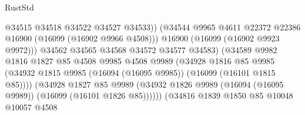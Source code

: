 \begin{lexlean}{RustStd}
\begin{coremodule}
                                            @34515
                                            @34518
                                            @34522
                                            @34527
                                            @34533))
                                        (@34544
                                          @9965
                                          @4611
                                          @22372
                                          @22386
                                          @16900
                                          (@16099 (@16902 @9966 @4508)))
                                        @16900
                                        (@16099 (@16902 @9923 @9972)))
                                      @34562
                                      @34565
                                      @34568
                                      @34572
                                      @34577
                                      @34583)
                                    (@34589
                                      @9982
                                      @1816
                                      @1827
                                      @85
                                      @4508
                                      @9985
                                      @4508
                                      @9989
                                      (@34928
                                        @1816
                                        @85
                                        @9985
                                        (@34932
                                          @1815
                                          @9985
                                          (@16094 (@16095 @9985))
                                          (@16099 (@16101 @1815 @85))))
                                      (@34928
                                        @1827
                                        @85
                                        @9989
                                        (@34932
                                          @1826
                                          @9989
                                          (@16094 (@16095 @9989))
                                          (@16099 (@16101 @1826 @85))))))
                                  (@34816
                                    @1839
                                    @1850
                                    @85
                                    @10048
                                    @10057
                                    @4508

\end{coremodule}
\end{lexlean}
